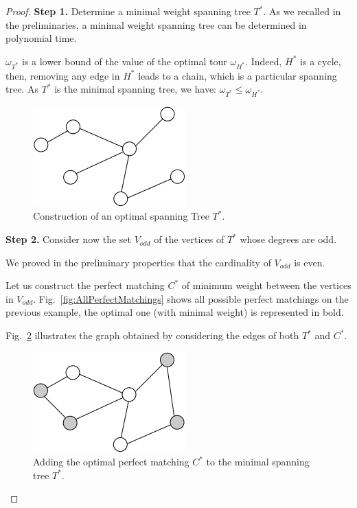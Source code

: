 \begin{proof}
\textbf{Step 1.} Determine a minimal weight spanning tree $T^*$. 
As we recalled in the preliminaries, a minimal weight spanning tree can be determined in polynomial time. 
\bigskip

$\omega_{T^*}$ is a lower bound of the value of the optimal tour $\omega_{H^*}$. 
Indeed, $H^*$ is a cycle, then, removing any edge in $H^*$ leads to a chain, which is a particular spanning tree.
As $T^*$ is the minimal spanning tree, we have:
$\omega_{T^*} \leq \omega_{H^*}$.

\begin{figure}[hbt]
\begin{center}
       \includegraphics[scale=0.6]{FiguresGraph/christofides2}
       \caption{Construction of an optimal spanning Tree $T^*$.}
              \label{fig:christofidesSpanningTree}
\end{center}
\end{figure}


\textbf{Step 2.} Consider now the set $V_{odd}$ of the vertices of $T^*$ whose degrees are odd. 

We proved in the preliminary properties that the cardinality of $V_{odd}$ is even. 

Let us construct the perfect matching $C^*$ of minimum weight between the vertices in $V_{odd}$. 
Fig.~\ref{fig:AllPerfectMatchings} shows all possible perfect matchings on the previous example, the optimal one (with minimal weight) is represented in bold. 

Fig.~\ref{fig:christofidesPerfectMatching} illustrates the graph obtained by considering the edges of both $T^*$ and $C^*$. 
\begin{figure}[hbt]
\begin{center}
       \includegraphics[scale=0.6]{FiguresGraph/christofides3}
       \caption{Adding the optimal perfect matching $C^*$ to the minimal spanning tree $T^*$.}
              \label{fig:christofidesPerfectMatching}
\end{center}
\end{figure}


\end{proof}
